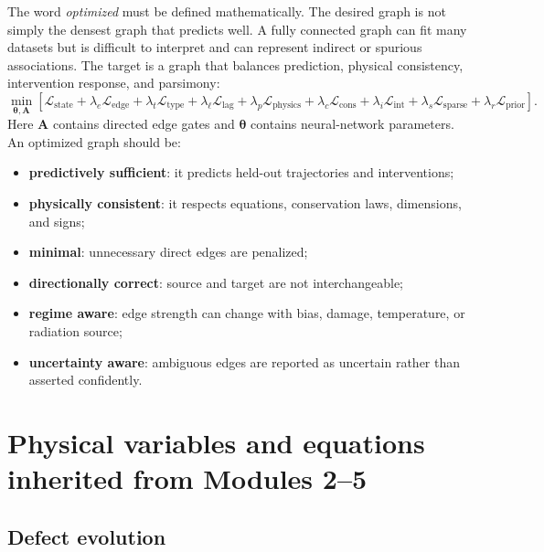 \documentclass[11pt]{article}
\newcommand{\Amat}{\bm{A}}
\newcommand{\thetavec}{\bm{\theta}}
\newcommand{\Lstate}{\mathcal{L}_{\mathrm{state}}}
\newcommand{\Ledge}{\mathcal{L}_{\mathrm{edge}}}
\newcommand{\Ltype}{\mathcal{L}_{\mathrm{type}}}
\newcommand{\Llag}{\mathcal{L}_{\mathrm{lag}}}
\newcommand{\Lphysics}{\mathcal{L}_{\mathrm{physics}}}
\newcommand{\Lcons}{\mathcal{L}_{\mathrm{cons}}}
\newcommand{\Lsparse}{\mathcal{L}_{\mathrm{sparse}}}
\newcommand{\Lprior}{\mathcal{L}_{\mathrm{prior}}}
\newcommand{\Lint}{\mathcal{L}_{\mathrm{int}}}
\begin{document}
The word \emph{optimized} must be defined mathematically. The desired graph is not simply the densest graph that predicts well. A fully connected graph can fit many datasets but is difficult to interpret and can represent indirect or spurious associations. The target is a graph that balances prediction, physical consistency, intervention response, and parsimony:
\begin{equation}
\min_{\thetavec,\Amat}
\left[
\Lstate
+\lambda_e\Ledge
+\lambda_t\Ltype
+\lambda_{\ell}\Llag
+\lambda_p\Lphysics
+\lambda_c\Lcons
+\lambda_i\Lint
+\lambda_s\Lsparse
+\lambda_r\Lprior
\right].
\label{eq:master_graph_objective}
\end{equation}
Here \(\Amat\) contains directed edge gates and \(\thetavec\) contains neural-network parameters. An optimized graph should be:
\begin{itemize}[leftmargin=1.5em]
    \item \textbf{predictively sufficient}: it predicts held-out trajectories and interventions;
    \item \textbf{physically consistent}: it respects equations, conservation laws, dimensions, and signs;
    \item \textbf{minimal}: unnecessary direct edges are penalized;
    \item \textbf{directionally correct}: source and target are not interchangeable;
    \item \textbf{regime aware}: edge strength can change with bias, damage, temperature, or radiation source;
    \item \textbf{uncertainty aware}: ambiguous edges are reported as uncertain rather than asserted confidently.
\end{itemize}

\section{Physical variables and equations inherited from Modules 2--5}

\subsection{Defect evolution}
\end{document}
